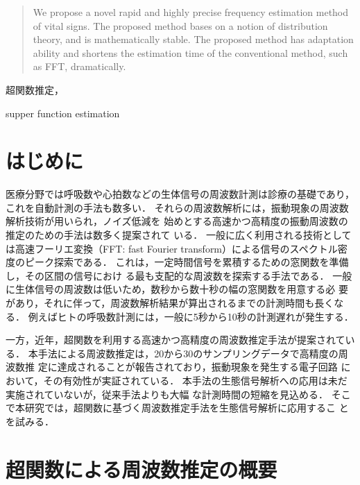 \documentclass{ieej}
\begin{document}
\begin{abstract}
 We propose a novel rapid and highly precise frequency estimation
 method of vital signs.
 The proposed method bases on a notion of distribution theory, and  
 is mathematically stable.  
 The proposed method has adaptation ability and shortens the estimation
 time of the conventional method, such as FFT, dramatically. 
\end{abstract}
\begin{jkeyword}
 超関数推定，
\end{jkeyword}
\begin{ekeyword}
 supper function estimation
\end{ekeyword}
\maketitle

\section{はじめに}
%
医療分野では呼吸数や心拍数などの生体信号の周波数計測は診療の基礎であり，
これを自動計測の手法も数多い．
%
それらの周波数解析には，振動現象の周波数解析技術が用いられ，ノイズ低減を
始めとする高速かつ高精度の振動周波数の推定のための手法は数多く提案されて
いる．
%
一般に広く利用される技術としては高速フーリエ変換（FFT: fast Fourier
transform）による信号のスペクトル密度のピーク探索である．
%
これは，一定時間信号を累積するための窓関数を準備し，その区間の信号におけ
る最も支配的な周波数を探索する手法である．
%
一般に生体信号の周波数は低いため，数秒から数十秒の幅の窓関数を用意する必
要があり，それに伴って，周波数解析結果が算出されるまでの計測時間も長くなる．
%
例えばヒトの呼吸数計測には，一般に5秒から10秒の計測遅れが発生する．


一方，近年，超関数を利用する高速かつ高精度の周波数推定手法が提案されてい
る\cite{SF}．
%
本手法による周波数推定は，20から30のサンプリングデータで高精度の周波数推
定に達成されることが報告されており\cite{SF}，振動現象を発生する電子回路
において，その有効性が実証されている．
%
本手法の生態信号解析への応用は未だ実施されていないが，従来手法よりも大幅
な計測時間の短縮を見込める．
%
そこで本研究では，超関数に基づく周波数推定手法を生態信号解析に応用するこ
とを試みる．


\section{超関数による周波数推定の概要}
\end{document}
